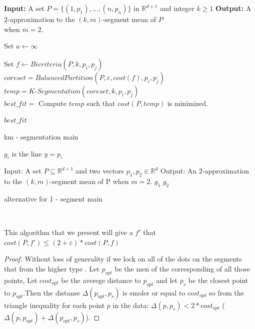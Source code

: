 \documentclass{vldb}
\begin{document}
\begin{algorithm}
\begin{algorithmic}
\STATE \textbf{Input:} A set $P = \lbrace(1,p_1),...,(n,p_n)\rbrace$ in $ \mathbb{R}^{d+1}$
and integer $k\geq1$
\STATE \textbf{Output:} A $2$-approximation to the $(k,m)$-segment mean of $P$\\ when $m=2$.
 
Set $a\gets \infty$

\STATE 
Set $f \gets Bicriteria(P,k,p_i,p_j)$ \\
$coreset = BalancedPartition(P,\varepsilon,cost(f),p_i,p_j)$\\
$temp=K$-$Segmentation(coreset,k,p_i,p_j)$\\
\STATE $best\_fit = $ Compute $temp$ such that $cost(P,temp)$ is minimized.

\ENDFOR

\RETURN $best\_fit$



\caption{km - segmentation main}

\end{algorithmic}
\end{algorithm}
$g_i$ is the line $y= p_i$
\begin{algorithm}
\begin{algorithmic}
\STATE Input: A set $P\subseteq \mathbb{R}^{d+1}$
and two vectors $p_1,p_2 \in \mathbb{R}^d$
\STATE Output: An $2$-approximation to the $(k,m)$-segment mean of P when $m=2$.
\RETURN $g_1$
\ELSE
\RETURN $g_2$
\ENDIF 

\caption{alternative for 1 - segment main}

\end{algorithmic}
\end{algorithm}\\
\newtheorem{A}{Theorem}
\begin{theorem}
This algorithm that we present will give a $f'$ that 
$cost(P,f')\leq (2+\varepsilon)*cost(P,f)$
\\


\end{theorem}
\begin{proof}
Without loss of generality
if we lock on all of the dots on the segments that from the higher type .
Let $p_{opt}$ be the men of the corresponding of all those points, Let $cost_{opt}$ be the averege distance to $p_{opt}$ and let $p_{s}$ be the closest point to $p_{opt}$.Then the distanse $\Delta(p_{opt},p_s)$ is smoler or equal to $cost_{opt}$ so from the triangle inequality for each point $p$ in the data: $\Delta(p,p_s)<2*cost_{opt}$ ($\Delta(p,p_{opt})+\Delta(p_{opt},p_s)$).

\end{proof}
\end{document}
